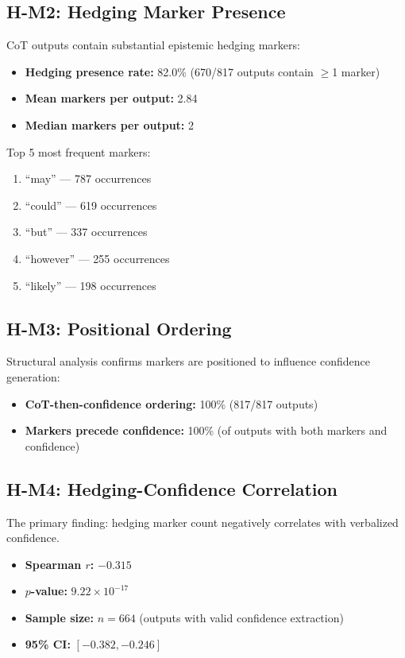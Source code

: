 \subsection{H-M2: Hedging Marker Presence}

CoT outputs contain substantial epistemic hedging markers:

\begin{itemize}
    \item \textbf{Hedging presence rate:} 82.0\% (670/817 outputs contain $\geq$1 marker)
    \item \textbf{Mean markers per output:} 2.84
    \item \textbf{Median markers per output:} 2
\end{itemize}

Top 5 most frequent markers:
\begin{enumerate}
    \item ``may'' --- 787 occurrences
    \item ``could'' --- 619 occurrences
    \item ``but'' --- 337 occurrences
    \item ``however'' --- 255 occurrences
    \item ``likely'' --- 198 occurrences
\end{enumerate}

\subsection{H-M3: Positional Ordering}

Structural analysis confirms markers are positioned to influence confidence generation:

\begin{itemize}
    \item \textbf{CoT-then-confidence ordering:} 100\% (817/817 outputs)
    \item \textbf{Markers precede confidence:} 100\% (of outputs with both markers and confidence)
\end{itemize}

\subsection{H-M4: Hedging-Confidence Correlation}

The primary finding: hedging marker count negatively correlates with verbalized confidence.

\begin{itemize}
    \item \textbf{Spearman $r$:} $-0.315$
    \item \textbf{$p$-value:} $9.22 \times 10^{-17}$
    \item \textbf{Sample size:} $n=664$ (outputs with valid confidence extraction)
    \item \textbf{95\% CI:} $[-0.382, -0.246]$
\end{itemize}

